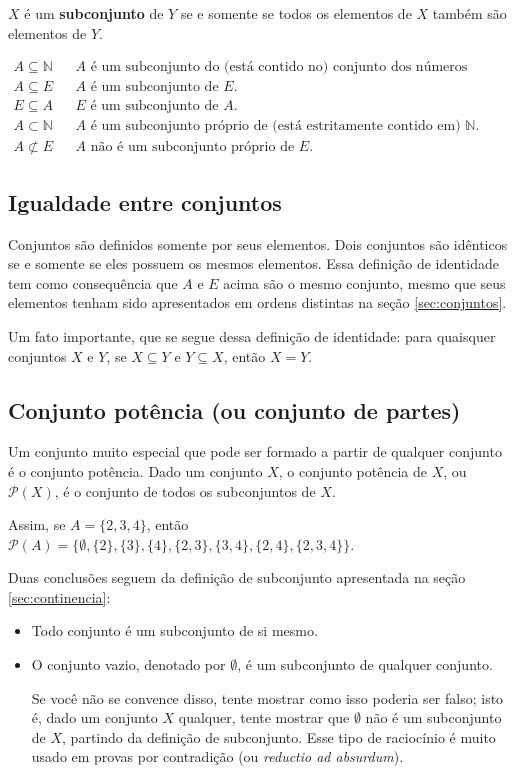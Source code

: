 \documentclass[11pt]{article}
\begin{document}
\(X\) é um \textbf{subconjunto} de \(Y\) se e somente se todos os elementos de \(X\) também são elementos de \(Y\).

\begin{align*}
  A \subseteq \mathbb{N} & & A \text{ é um subconjunto do (está contido no) conjunto dos números naturais.}\\
  A \subseteq E & & A \text{ é um subconjunto de } E.\\
  E \subseteq A & & E \text{ é um subconjunto de } A.\\
  A \subset \mathbb{N} & & A \text{ é um subconjunto próprio de (está estritamente contido em) } \mathbb{N}.\\
  A \not\subset E & & A \text{ não é um subconjunto próprio de } E.
\end{align*}

\subsection{Igualdade entre conjuntos}
\label{sec:igualdade}

Conjuntos são definidos somente por seus elementos. Dois conjuntos são idênticos se e somente se eles possuem os mesmos elementos. Essa definição de identidade tem como consequência que \(A\) e \(E\) acima são o mesmo conjunto, mesmo que seus elementos tenham sido apresentados em ordens distintas na seção \ref{sec:conjuntos}.

Um fato importante, que se segue dessa definição de identidade: para quaisquer conjuntos \(X\) e \(Y\), se \(X\subseteq Y\) e \(Y\subseteq X\), então \(X = Y\).

\subsection{Conjunto potência (ou conjunto de partes)}
\label{sec:conjunto-potencia}

Um conjunto muito especial que pode ser formado a partir de qualquer conjunto é o conjunto potência. Dado um conjunto \(X\), o conjunto potência de \(X\), ou \(\mathcal{P}(X)\), é o conjunto de todos os subconjuntos de \(X\).

Assim, se \(A = \{2, 3, 4\}\), então \(\mathcal{P}(A) = \{\emptyset, \{2\}, \{3\}, \{4\}, \{2, 3\}, \{3, 4\}, \{2, 4\}, \{2, 3, 4\}\}\).

Duas conclusões seguem da definição de subconjunto apresentada na seção \ref{sec:continencia}:
\begin{itemize}
\item Todo conjunto é um subconjunto de si mesmo.
\item O conjunto vazio, denotado por \(\emptyset\), é um subconjunto de qualquer conjunto.

  Se você não se convence disso, tente mostrar como isso poderia ser falso; isto é, dado um conjunto \(X\) qualquer, tente mostrar que \(\emptyset\) não é um subconjunto de \(X\), partindo da definição de subconjunto. Esse tipo de raciocínio é muito usado em provas por contradição (ou \emph{reductio ad absurdum}).
\end{itemize}
\end{document}
